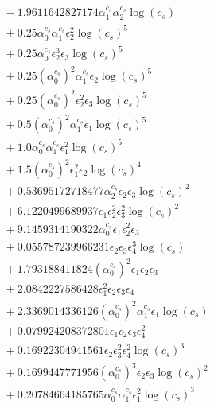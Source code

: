 \documentclass[10pt]{article}
\begin{document}
\begin{align*}
&{}  - 1.9611642827174 \alpha_{1}^{c_s} \alpha_{2}^{c_s} \log{\left(c_{s} \right)} \\
&{}  + 0.25 \alpha_{0}^{c_s} \alpha_{1}^{c_s} \epsilon_{2}^{2} \log{\left(c_{s} \right)}^{5} \\
&{}  + 0.25 \alpha_{0}^{c_s} \epsilon_{2}^{3} \epsilon_{3} \log{\left(c_{s} \right)}^{5} \\
&{}  + 0.25 \left(\alpha_{0}^{c_s}\right)^{2} \alpha_{1}^{c_s} \epsilon_{2} \log{\left(c_{s} \right)}^{5} \\
&{}  + 0.25 \left(\alpha_{0}^{c_s}\right)^{2} \epsilon_{2}^{2} \epsilon_{3} \log{\left(c_{s} \right)}^{5} \\
&{}  + 0.5 \left(\alpha_{0}^{c_s}\right)^{2} \alpha_{1}^{c_s} \epsilon_{1} \log{\left(c_{s} \right)}^{5} \\
&{}  + 1.0 \alpha_{0}^{c_s} \alpha_{1}^{c_s} \epsilon_{1}^{2} \log{\left(c_{s} \right)}^{5} \\
&{}  + 1.5 \left(\alpha_{0}^{c_s}\right)^{2} \epsilon_{1}^{2} \epsilon_{2} \log{\left(c_{s} \right)}^{4} \\
&{}  + 0.53695172718477 \alpha_{2}^{c_s} \epsilon_{2} \epsilon_{3} \log{\left(c_{s} \right)}^{2} \\
&{}  + 6.1220499689937 \epsilon_{1} \epsilon_{2}^{2} \epsilon_{3}^{2} \log{\left(c_{s} \right)}^{2} \\
&{}  + 9.1459314190322 \alpha_{0}^{c_s} \epsilon_{1} \epsilon_{2}^{2} \epsilon_{3} \\
&{}  + 0.055787239966231 \epsilon_{2} \epsilon_{3} \epsilon_{4}^{3} \log{\left(c_{s} \right)} \\
&{}  + 1.793188411824 \left(\alpha_{0}^{c_s}\right)^{2} \epsilon_{1} \epsilon_{2} \epsilon_{3} \\
&{}  + 2.0842227586428 \epsilon_{1}^{2} \epsilon_{2} \epsilon_{3} \epsilon_{4} \\
&{}  + 2.3369014336126 \left(\alpha_{0}^{c_s}\right)^{2} \alpha_{1}^{c_s} \epsilon_{1} \log{\left(c_{s} \right)} \\
&{}  + 0.079924208372801 \epsilon_{1} \epsilon_{2} \epsilon_{3} \epsilon_{4}^{2} \\
&{}  + 0.16922304941561 \epsilon_{2} \epsilon_{3}^{2} \epsilon_{4}^{2} \log{\left(c_{s} \right)}^{3} \\
&{}  + 0.1699447771956 \left(\alpha_{0}^{c_s}\right)^{3} \epsilon_{2} \epsilon_{3} \log{\left(c_{s} \right)}^{2} \\
&{}  + 0.20784664185765 \alpha_{0}^{c_s} \alpha_{1}^{c_s} \epsilon_{1}^{2} \log{\left(c_{s} \right)}^{3} \\

\end{align*}
\end{document}
